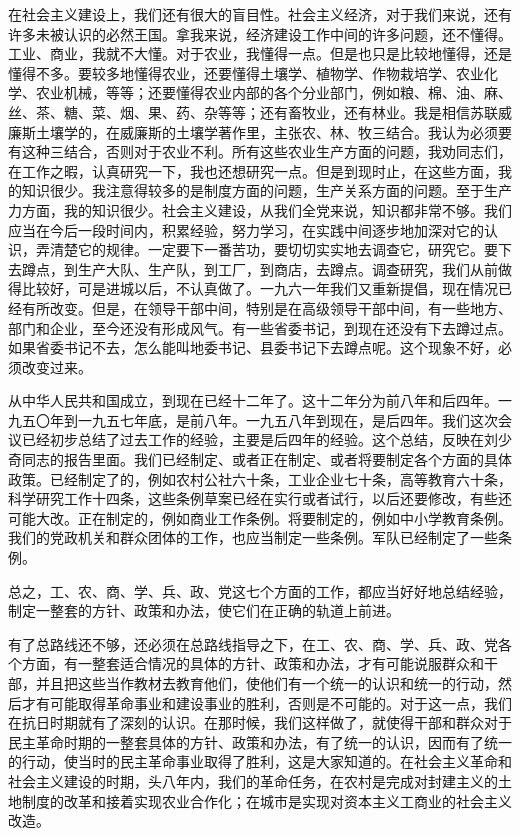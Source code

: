 在社会主义建设上，我们还有很大的盲目性。社会主义经济，对于我们来说，还有许多未被认识的必然王国。拿我来说，经济建设工作中间的许多问题，还不懂得。工业、商业，我就不大懂。对于农业，我懂得一点。但是也只是比较地懂得，还是懂得不多。要较多地懂得农业，还要懂得土壤学、植物学、作物栽培学、农业化学、农业机械，等等；还要懂得农业内部的各个分业部门，例如粮、棉、油、麻、丝、茶、糖、菜、烟、果、药、杂等等；还有畜牧业，还有林业。我是相信苏联威廉斯土壤学的，在威廉斯的土壤学著作里，主张农、林、牧三结合。我认为必须要有这种三结合，否则对于农业不利。所有这些农业生产方面的问题，我劝同志们，在工作之暇，认真研究一下，我也还想研究一点。但是到现时止，在这些方面，我的知识很少。我注意得较多的是制度方面的问题，生产关系方面的问题。至于生产力方面，我的知识很少。社会主义建设，从我们全党来说，知识都非常不够。我们应当在今后一段时间内，积累经验，努力学习，在实践中间逐步地加深对它的认识，弄清楚它的规律。一定要下一番苦功，要切切实实地去调查它，研究它。要下去蹲点，到生产大队、生产队，到工厂，到商店，去蹲点。调查研究，我们从前做得比较好，可是进城以后，不认真做了。一九六一年我们又重新提倡，现在情况已经有所改变。但是，在领导干部中间，特别是在高级领导干部中间，有一些地方、部门和企业，至今还没有形成风气。有一些省委书记，到现在还没有下去蹲过点。如果省委书记不去，怎么能叫地委书记、县委书记下去蹲点呢。这个现象不好，必须改变过来。

从中华人民共和国成立，到现在已经十二年了。这十二年分为前八年和后四年。一九五〇年到一九五七年底，是前八年。一九五八年到现在，是后四年。我们这次会议已经初步总结了过去工作的经验，主要是后四年的经验。这个总结，反映在刘少奇同志的报告里面。我们已经制定、或者正在制定、或者将要制定各个方面的具体政策。已经制定了的，例如农村公社六十条，工业企业七十条，高等教育六十条，科学研究工作十四条，这些条例草案已经在实行或者试行，以后还要修改，有些还可能大改。正在制定的，例如商业工作条例。将要制定的，例如中小学教育条例。我们的党政机关和群众团体的工作，也应当制定一些条例。军队已经制定了一些条例。

总之，工、农、商、学、兵、政、党这七个方面的工作，都应当好好地总结经验，制定一整套的方针、政策和办法，使它们在正确的轨道上前进。

有了总路线还不够，还必须在总路线指导之下，在工、农、商、学、兵、政、党各个方面，有一整套适合情况的具体的方针、政策和办法，才有可能说服群众和干部，并且把这些当作教材去教育他们，使他们有一个统一的认识和统一的行动，然后才有可能取得革命事业和建设事业的胜利，否则是不可能的。对于这一点，我们在抗日时期就有了深刻的认识。在那时候，我们这样做了，就使得干部和群众对于民主革命时期的一整套具体的方针、政策和办法，有了统一的认识，因而有了统一的行动，使当时的民主革命事业取得了胜利，这是大家知道的。在社会主义革命和社会主义建设的时期，头八年内，我们的革命任务，在农村是完成对封建主义的土地制度的改革和接着实现农业合作化；在城市是实现对资本主义工商业的社会主义改造。

